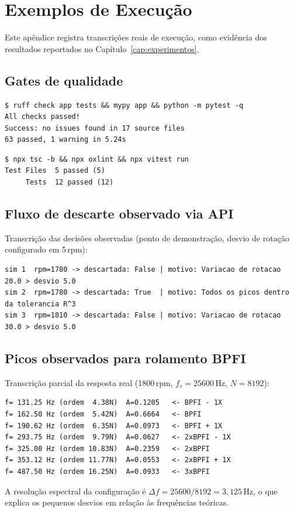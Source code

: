 \chapter{Exemplos de Execução}
\label{ap:execucao}

Este apêndice registra transcrições reais de execução, como evidência dos
resultados reportados no Capítulo~\ref{cap:experimentos}.

\section{Gates de qualidade}

\begin{verbatim}
$ ruff check app tests && mypy app && python -m pytest -q
All checks passed!
Success: no issues found in 17 source files
63 passed, 1 warning in 5.24s
\end{verbatim}


\begin{verbatim}
$ npx tsc -b && npx oxlint && npx vitest run
Test Files  5 passed (5)
     Tests  12 passed (12)
\end{verbatim}


\section{Fluxo de descarte observado via API}

Transcrição das decisões observadas (ponto de demonstração, desvio de rotação
configurado em 5\,rpm):

\begin{verbatim}
sim 1  rpm=1780 -> descartada: False | motivo: Variacao de rotacao 20.0 > desvio 5.0
sim 2  rpm=1780 -> descartada: True  | motivo: Todos os picos dentro da tolerancia R^3
sim 3  rpm=1810 -> descartada: False | motivo: Variacao de rotacao 30.0 > desvio 5.0
\end{verbatim}


\section{Picos observados para rolamento BPFI}

Transcrição parcial da resposta real (1800\,rpm, \(f_s=25600\)\,Hz, \(N=8192\)):

\begin{verbatim}
f= 131.25 Hz (ordem  4.38N)  A=0.1205   <- BPFI - 1X
f= 162.50 Hz (ordem  5.42N)  A=0.6664   <- BPFI
f= 190.62 Hz (ordem  6.35N)  A=0.0973   <- BPFI + 1X
f= 293.75 Hz (ordem  9.79N)  A=0.0627   <- 2xBPFI - 1X
f= 325.00 Hz (ordem 10.83N)  A=0.2359   <- 2xBPFI
f= 353.12 Hz (ordem 11.77N)  A=0.0553   <- 2xBPFI + 1X
f= 487.50 Hz (ordem 16.25N)  A=0.0933   <- 3xBPFI
\end{verbatim}


A resolução espectral da configuração é \(\Delta f = 25600/8192 =
3{,}125\)\,Hz, o que explica os pequenos desvios em relação às frequências
teóricas.
